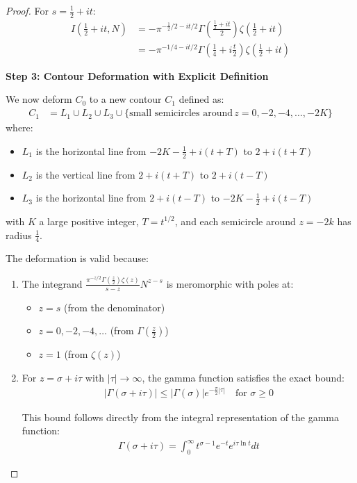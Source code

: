 \documentclass{article}
\begin{document}
\begin{proof}
For $s = \frac{1}{2}+it$:
\begin{align}
I\left(\frac{1}{2}+it,N\right) &= -\pi^{-\frac{1}{2}/2-it/2}\Gamma\left(\frac{\frac{1}{2}+it}{2}\right)\zeta\left(\frac{1}{2}+it\right) \label{eq:residue_specific1}\\
&= -\pi^{-1/4-it/2}\Gamma\left(\frac{1}{4}+i\frac{t}{2}\right)\zeta\left(\frac{1}{2}+it\right) \label{eq:residue_specific2}
\end{align}

\textbf{Step 3: Contour Deformation with Explicit Definition}

We now deform $C_0$ to a new contour $C_1$ defined as:
\begin{align}\label{eq:contour_deformed}
C_1 &= L_1 \cup L_2 \cup L_3 \cup \{\text{small semicircles around} \, z=0,-2,-4,\ldots,-2K\}
\end{align}
where:
\begin{itemize}
\item $L_1$ is the horizontal line from $-2K-\frac{1}{2}+i(t+T)$ to $2+i(t+T)$
\item $L_2$ is the vertical line from $2+i(t+T)$ to $2+i(t-T)$
\item $L_3$ is the horizontal line from $2+i(t-T)$ to $-2K-\frac{1}{2}+i(t-T)$
\end{itemize}
with $K$ a large positive integer, $T = t^{1/2}$, and each semicircle around $z=-2k$ has radius $\frac{1}{4}$.

The deformation is valid because:
\begin{enumerate}
\item The integrand $\frac{\pi^{-z/2}\Gamma\left(\frac{z}{2}\right)\zeta(z)}{s-z}N^{z-s}$ is meromorphic with poles at:
   \begin{itemize}
   \item $z=s$ (from the denominator)
   \item $z=0,-2,-4,\ldots$ (from $\Gamma\left(\frac{z}{2}\right)$)
   \item $z=1$ (from $\zeta(z)$)
   \end{itemize}

\item For $z = \sigma + i\tau$ with $|\tau| \to \infty$, the gamma function satisfies the exact bound:
   \begin{align}\label{eq:gamma_bound}
   |\Gamma(\sigma + i\tau)| \leq |\Gamma(\sigma)|e^{-\frac{\pi}{2}|\tau|} \quad \text{for } \sigma \geq 0
   \end{align}
   
   This bound follows directly from the integral representation of the gamma function:
   \begin{align}\label{eq:gamma_integral}
   \Gamma(\sigma + i\tau) = \int_0^\infty t^{\sigma-1}e^{-t}e^{i\tau\ln t}dt
   \end{align}
   

\end{enumerate}
\end{proof}
\end{document}
